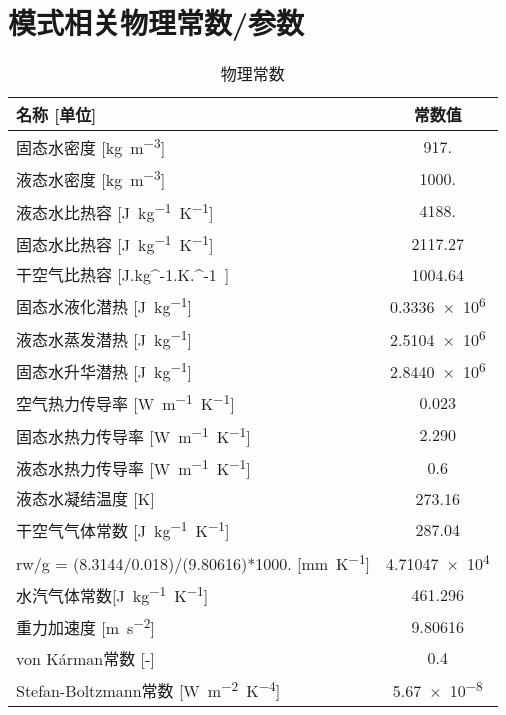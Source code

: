 \chapter{模式相关物理常数/参数}\label{模式相关物理常数参数}
\begin{table}[]
    \centering
    \caption{物理常数}
    \label{tab:物理常数}
    \begin{tabular}{@{}lc@{}}
    \toprule
    名称 {[}单位{]}                                     & 常数值       \\
    \midrule
    固态水密度 {[}\unit{kg.m^{-3}}{]}                  & 917.        \\
    液态水密度 {[}\unit{kg.m^{-3}}{]}                  & 1000.       \\
    液态水比热容 {[}\unit{J.kg^{-1}.K^{-1}}{]}         & 4188.       \\
    固态水比热容 {[}\unit{J.kg^{-1}.K^{-1}}{]}         & 2117.27     \\
    干空气比热容 {[}\unit{J.kg^{-1}.K.^{-1}}{]}        & 1004.64     \\
    固态水液化潜热 {[}\unit{J.kg^{-1}}{]}             & \num{0.3336e6}  \\
    液态水蒸发潜热 {[}\unit{J.kg^{-1}}{]}             & \num{2.5104e6}  \\
    固态水升华潜热 {[}\unit{J.kg^{-1}}{]}             & \num{2.8440e6}  \\
    空气热力传导率 {[}\unit{W.m^{-1}.K^{-1}}{]}       & 0.023       \\
    固态水热力传导率 {[}\unit{W.m^{-1}.K^{-1}}{]}      & 2.290       \\
    液态水热力传导率 {[}\unit{W.m^{-1}.K^{-1}}{]}      & 0.6         \\
    液态水凝结温度 {[}K{]}                             & 273.16      \\
    干空气气体常数 {[}\unit{J.kg^{-1}.K^{-1}}{]}       & 287.04      \\
    rw/g = (8.3144/0.018)/(9.80616)*1000. {[}\unit{mm.K^{-1}}{]} & \num{4.71047e4} \\
    水汽气体常数{[}\unit{J.kg^{-1}.K^{-1}}{]}         & 461.296     \\
    重力加速度 {[}\unit{m.s^{-2}}{]}                  & 9.80616     \\
    von K\'arman常数 {[}-{]}                         & 0.4         \\
    Stefan-Boltzmann常数 {[}\unit{W.m^{-2}.K^{-4}}{]} & \num{5.67e-8}\\
    \bottomrule
    \end{tabular}
\end{table}

